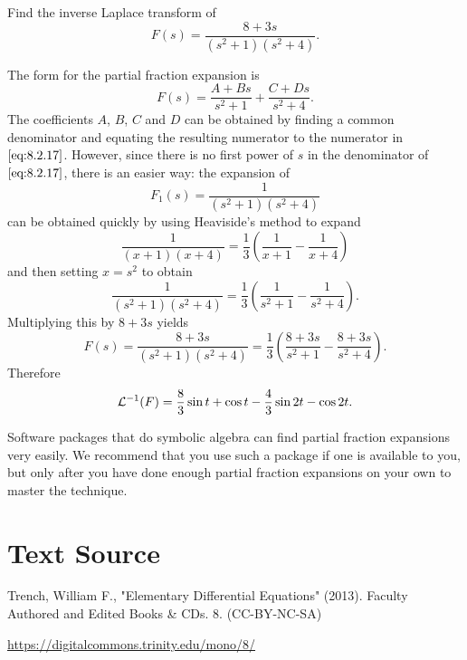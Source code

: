 \documentclass{ximera}
\begin{document}
\begin{example}\label{example:8.2.9}
Find the inverse Laplace transform of
\begin{equation}\label{eq:8.2.17}
F(s)=\frac{8+3s}{(s^2+1)(s^2+4)}.
\end{equation}
\begin{explanation}
The form for the partial fraction expansion is
$$
F(s)=\frac{A+Bs}{s^2+1}+\frac{C+Ds}{s^2+4}.
$$
The coefficients $A$, $B$, $C$ and $D$ can be obtained by finding a common
denominator and equating the resulting numerator to the numerator in
$\eqref{eq:8.2.17}$. However, since there is no first power of $s$ in the
denominator of $\eqref{eq:8.2.17}$, there is an easier way: the expansion of
$$
F_1(s)=\frac{1}{(s^2+1)(s^2+4)}
$$
can be obtained quickly by using Heaviside's method to expand
$$
\frac{1}{(x+1)(x+4)}=\frac{1}{3}\left(\frac{1}{x+1}-\frac{1}{x+4}\right)
$$
and then setting $x=s^2$ to obtain
$$
\frac{1}{(s^2+1)(s^2+4)}=\frac{1}{3}\left(\frac{1}{s^2+1}-\frac{1}{s^2+4}\right).
$$
Multiplying this by $8+3s$ yields
$$
F(s)=\frac{8+3s}{(s^2+1)(s^2+4)}=\frac{1}{3}\left(\frac{8+3s}{s^2+1}-\frac{8+3s}{s^2+4}\right).
$$
Therefore
$$
{\cal L}^{-1}(F)=\frac{8}{3}\sin t+\cos t-\frac{4}{3}\sin 2t-\cos 2t.
$$
\end{explanation}
\end{example}

Software packages that do symbolic algebra can find partial
fraction expansions very easily. We recommend that you use such a
package if one is available to you, but only after you have  done enough partial fraction expansions on your own to  master the technique.



\section*{Text Source}
Trench, William F., "Elementary Differential Equations" (2013). Faculty Authored and Edited Books \& CDs. 8. (CC-BY-NC-SA)

\href{https://digitalcommons.trinity.edu/mono/8/}{https://digitalcommons.trinity.edu/mono/8/}
\end{document}

